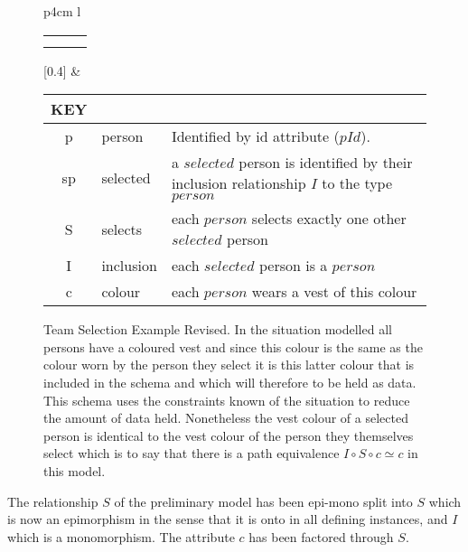 \begin{figure} [h]
\begin{center}
\begin{tabular}{p{4cm}  l }
\begin{tabular}{c p{1.5cm} c}
   \Rnode{sp}{\rnode{sps}{s}\rnode{spp}{p}} & &    \\[1.4cm]
   \Rnode{p}{p}   & & \Rnode{v}{v}
\end{tabular}
\idcomp
{}
[0.4]
\idcomp &\footnotesize
\begin{tabular}{c p{1.5cm} p{4cm}}
KEY && \\
\hline
p & person & Identified by id attribute ($pId$). \\
sp & selected & a $selected$ person is identified by their inclusion relationship $I$ to the type $person$ \\
S & selects & each $person$ selects exactly one other $selected$ person \\
I & inclusion & each $selected$ person is a $person$ \\
c & colour & each $person$ wears a vest of this colour 
\end{tabular} 
\end{tabular}
\end{center}
\caption{Team Selection Example Revised. 
In the situation modelled all persons have a coloured vest and since this colour is the same as the colour 
worn by the person they select it is this latter colour that is included in the schema and which will therefore to be held as data. 
This schema uses the constraints known of the situation to reduce the amount of data held.
Nonetheless the  vest colour  of a selected person is 
identical to the vest colour of the person they themselves select which is to say that there is a  path equivalence $I \circ S \circ c \simeq c$ in this model.
}
\label{teamselectionrevisedERschema}
\end{figure}

\begin{categoricalaside}

The relationship $S$ of the preliminary model has been epi-mono split into $S$ which is now an epimorphism in the sense that it is onto in all defining instances,
and $I$ which is a monomorphism. The attribute $c$ has been factored through $S$.
\end{categoricalaside}

